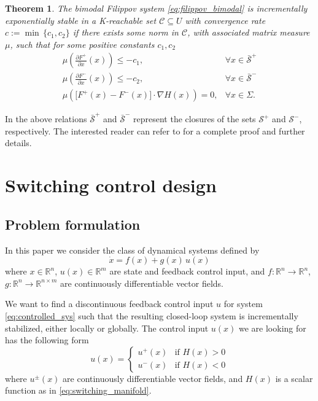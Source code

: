 \documentclass[letterpaper, 10 pt, conference]{ieeeconf}
\newtheorem{theorem}{Theorem}
\begin{document}
\begin{theorem}
\label{thm:contracting_pws}
The bimodal Filippov system \eqref{eq:filippov_bimodal} is incrementally exponentially stable in a K-reachable set $\mathcal{C}\subseteq U$ with convergence rate $c:=\min\,\{c_1,c_2\}$ if there exists some norm in $\mathcal{C}$, with associated matrix measure $\mu$, such that for some positive constants $c_1,c_2$
\begin{eqnarray*}
\label{eq:thm:condition1}
\mu\left( \frac{\partial F^+}{\partial x}(x)\right) \leq -c_1, &\forall x \in \bar{\mathcal{S}}^+\\
\label{eq:thm:condition2}
\mu\left( \frac{\partial F^-}{\partial x}(x)\right) \leq -c_2,  &\forall x \in \bar{\mathcal{S}}^-\\ 
\label{eq:thm:condition3}
\mu\left( \Big[ F^+(x)-F^-(x)\Big] \cdot \nabla H(x) \right) = 0,  &\forall x \in \Sigma.
\end{eqnarray*}
\end{theorem}
\vspace{0.3cm}
In the above relations $\bar{\mathcal{S}}^+$ and $\bar{\mathcal{S}}^-$ represent the closures of the sets $\mathcal{S}^+$ and $\mathcal{S}^-$, respectively.
The interested reader can refer to \cite{fiore2015contraction} for a complete proof and further details.

\section{Switching control design}
\label{sec:control_design}
\subsection{Problem formulation}
In this paper we consider the class of dynamical systems defined by
\begin{equation}
\label{eq:controlled_sys}
\dot{x}=f(x)+g(x)\,u(x)
\end{equation}
where $x\in\mathbb{R}^n$, $u(x)\in\mathbb{R}^m$ are state and feedback control input, and  $f:\mathbb{R}^n\rightarrow\mathbb{R}^n$, $g:\mathbb{R}^n\rightarrow\mathbb{R}^{n\times m}$ are continuously differentiable vector fields.

We want to find a discontinuous feedback control input $u$ for system \eqref{eq:controlled_sys} such that the resulting closed-loop system is incrementally stabilized, either locally or globally. The control input $u(x)$ we are looking for has the following form
\begin{equation}
\label{eq:control_input}
u(x)=
\begin{cases}
u^+(x) & \mbox{if } H(x)>0\\
u^-(x) & \mbox{if } H(x)<0
\end{cases}
\end{equation}
where $u^\pm(x)$ are continuously differentiable vector fields, and $H(x)$ is a scalar function as in \eqref{eq:switching_manifold}.
\end{document}
